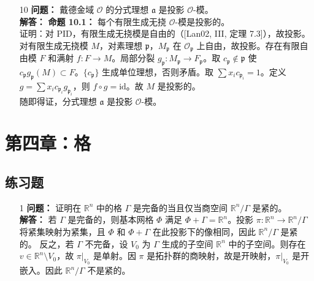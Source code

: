 \documentclass[UTF8]{ctexart}
\begin{document}
\begin{enumerate}
\begin{enumerate}
\item[10]
\textbf{问题：} 戴德金域 \(\mathcal{O}\) 的分式理想 \(\mathfrak{a}\) 是投影 \(\mathcal{O}\)-模。\\
\textbf{解答：} \textbf{命题 10.1：} 每个有限生成无挠 \(\mathcal{O}\)-模是投影的。\\
证明：对 PID，有限生成无挠模是自由的（[Lan02, III, 定理 7.3]），故投影。对有限生成无挠模 \(M\)，对素理想 \(\mathfrak{p}\)，\(M_\mathfrak{p}\) 在 \(\mathcal{O}_\mathfrak{p}\) 上自由，故投影。存在有限自由模 \(F\) 和满射 \(f: F \to M\)。局部分裂 \(g_\mathfrak{p}: M_\mathfrak{p} \to F_\mathfrak{p}\)。取 \(c_\mathfrak{p} \notin \mathfrak{p}\) 使 \(c_\mathfrak{p} g_\mathfrak{p}(M) \subset F\)。\(\{c_\mathfrak{p}\}\) 生成单位理想，否则矛盾。取 \(\sum x_i c_{\mathfrak{p}_i} = 1\)。定义 \(g = \sum x_i c_{\mathfrak{p}_i} g_{\mathfrak{p}_i}\)，则 \(f \circ g = \text{id}\)。故 \(M\) 是投影的。\\
随即得证，分式理想 \(\mathfrak{a}\) 是投影 \(\mathcal{O}\)-模。

\end{enumerate}

\section{第四章：格}

\subsection{练习题}

\begin{enumerate}

\item[1] 
\textbf{问题：} 证明在 \(\mathbb{R}^n\) 中的格 \(\Gamma\) 是完备的当且仅当商空间 \(\mathbb{R}^n / \Gamma\) 是紧的。\\
\textbf{解答：} 若 \(\Gamma\) 是完备的，则基本网格 \(\Phi\) 满足 \(\Phi + \Gamma = \mathbb{R}^n\)。投影 \(\pi: \mathbb{R}^n \to \mathbb{R}^n / \Gamma\) 将紧集映射为紧集，且 \(\Phi\) 和 \(\Phi + \Gamma\) 在此投影下的像相同，因此 \(\mathbb{R}^n / \Gamma\) 是紧的。  
反之，若 \(\Gamma\) 不完备，设 \(V_0\) 为 \(\Gamma\) 生成的子空间 \(\mathbb{R}^n\) 中的子空间。则存在 \(v \in \mathbb{R}^n \setminus V_0\)，故 \(\pi|_{V_0}\) 是单射。因 \(\pi\) 是拓扑群的商映射，故是开映射，\(\pi|_{V_0}\) 是开嵌入。因此 \(\mathbb{R}^n / \Gamma\) 不是紧的。


\end{enumerate}
\end{enumerate}
\end{document}

